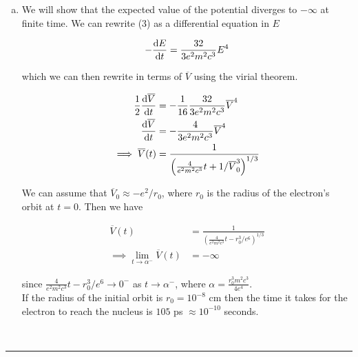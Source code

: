\documentclass[]{article}
\begin{document}
\begin{enumerate}[a)]
\item We will show that the expected value of the potential diverges to $-\infty$ at finite time. We can rewrite (3) as a differential equation in $E$

\begin{equation}
\begin{split}
- \dv{E}{t} & = \frac{32}{3e^2m^2c^3}  E^4 \\
\end{split}
\end{equation}

which we can then rewrite in terms of $\overline{V}$ using the virial theorem. 

\begin{equation}
\begin{split}
\frac{1}{2} \dv{\overline{V}}{t} & = - \frac{1}{16} \frac{32}{3e^2m^2c^3}  \overline{V}^4 \\  \dv{\overline{V}}{t} & = - \frac{4}{3e^2m^2c^3}  \overline{V}^4 \\
\implies \overline{V}(t) & = \frac{1}{\left( \frac{4}{e^2m^2c^3} t + 1/\overline{V}_0^3  \right)^{1/3} }
\end{split}
\end{equation}

We can assume that $\overline{V}_0 \approx -e^2/r_0$, where $r_0$ is the radius of the electron's orbit at $t=0$. Then we have

\begin{equation}
\begin{split}
\overline{V}(t) & = \frac{1}{\left( \frac{4}{e^2m^2c^3} t - r_0^3/e^6  \right)^{1/3} } \\
\implies \lim_{t \to \alpha^- } \overline{V}(t) & = - \infty 
\end{split}
\end{equation}

since $ \frac{4}{e^2m^2c^3} t - r_0^3/e^6  \to 0^-$ as $t \to \alpha^-$, where $\alpha = \frac{ r_0^3 m^2c^3 }{ 4 e^4   }$. \\

If the radius of the initial orbit is $r_0 = 10^{-8}$ cm then the time it takes for the electron to reach the nucleus is $105$ ps $\approx 10^{-10}$ seconds. \\

\end{enumerate}

\hfill \\
\noindent\rule{15cm}{0.4pt} \\
\end{document}
